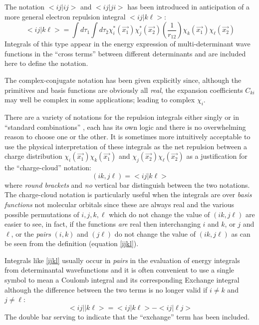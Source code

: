 The notation $< i j | i j >$ and $< i j | j i > $ has been
introduced in anticipation of a more general electron
repulsion integral $ < i j | k \ell > $:
\begin{equation}
 < i j | k \ell > = 
\int { d\tau_1 \int { d\tau_2 \chi_i^* (\vec{x_1})\chi_j^* (\vec{x_2})
\left ( \frac{1}{r_{12}} \right )
\chi_k (\vec{x_1})\chi_{\ell} (\vec{x_2}) } }
\label{ijkl}
\end{equation}
Integrals of this type appear in the energy expression of
multi-determinant wave functions in the ``cross terms''
between different determinants and are included here to 
define the notation.

The complex-conjugate notation has been given explicitly since,
although the primitives and basis functions are obviously all {\em real},
the expansion coefficients $C_{ki}$ may well be complex in some
applications; leading to complex $\chi_i$.

There are a variety of notations for the repulsion integrals
either singly or in ``standard combinations'' , each
has its own logic and there is no overwhelming reason to
choose one or the other. It is sometimes more intuitively
acceptable to use the physical interpretation of these integrals
as the net repulsion between a charge distribution 
$\chi_i (\vec{x_1})\chi_k (\vec{x_1})$ and 
$\chi_j (\vec{x_2})\chi_{\ell} (\vec{x_2})$
as a justification for the ``charge-cloud'' notation:
\begin{equation}
( i k , j \ell ) = < i j | k \ell >
\end{equation}
where {\em round brackets} and {\em no} vertical bar distinguish
between the two notations. The charge-cloud notation is particularly
useful when the integrals are over {\em basis functions} not
molecular orbitals since these are always real and the various possible
permutations of $i, j, k, \ell $ which do not change the
value of $(ik, j \ell )$  are easier to see, in fact, if the 
functions {\em are} real then interchanging $i$ and $k$, or
$j$ and $\ell$, or the {\em pairs} $(i,k)$ and $(j \ell )$
do not change the value of $(ik, j \ell )$ as can be seen from the 
definition
(equation \ref{ijkl}).

Integrals like \ref{ijkl} usually occur in {\em pairs} in the
evaluation of energy integrals from determinantal wavefunctions
and it is often convenient to use a single symbol to
mean a Coulomb integral and its corresponding Exchange integral
although the difference between the two terms is no longer valid
if $ i \not= k$ and $j \not= \ell$:
\begin{equation}
<i j || k \ell > = < i j | k \ell > - < i j | \ell j >
\label{doubar}
\end{equation}
The double bar serving to indicate that the ``exchange''
term has been included.
